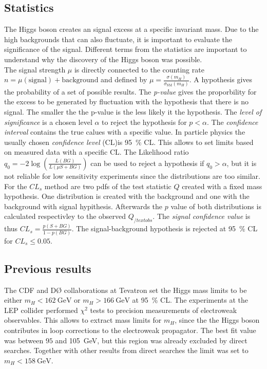 \subsection{Statistics}
The Higgs boson creates an signal excess at a specific invariant mass. Due to the high backgrounds that can also fluctuate, it is important to evaluate the significance of the signal. Different terms from the statistics are important to understand why the discovery of the Higgs boson was possible.\\
The signal strength $\mu$ is directly connected to the counting rate $n=\mu(\text{signal})+\text{background}$ and defined by $\mu = \frac{\sigma(m_H)}{\sigma_{\text{SM}}(m_H)}$. A hypothesis gives the probability of a set of possible results. The \textit{p-value} gives the proporbility for the excess to be generated by fluctuation with the hypothesis that there is no signal. The smaller the the p-value is the less likely it the hypothesis. The \textit{level of significance} is a chosen level $\alpha$ to reject the hypothesis for $p<\alpha$. The \textit{confidence interval} contains the true calues with a specific value. In particle physics the usually chosen \textit{confidence level} (CL)is \SI{95}{\percent} CL. This allows to set limits based on measured data with a specific CL.
The Likelihood ratio $q_0 = -2 \log \left(\frac{L(BG)}{L(\mu S+BG)}\right)$ can be used to reject a hypothesis if $q_0>\alpha$, but it is not reliable for low sensitivity experiments since the distributions are too similar.\\
For the $CL_s$ method are two pdfs of the test statistic $Q$ created with a fixed mass hypothesis. One distribution is created with the background and one with the background with signal hypithesis. Afterwards the $p$ value of both distributions is calculated respectivley to the observed $Q_{/text{obs}}$. The \textit{signal confidence value} is thus $CL_s = \frac{p(S+BG)}{1-p(BG)}$. The signal-background hypothesis is rejected at \SI{95}{\percent} CL for $CL_s\leq 0.05$.
\subsection{Previous results}
The CDF and D\O\; collaborations at Tevatron set the Higgs mass limits to be either $m_H<\SI{162}{\GeV}$ or $m_H>\SI{166}{\GeV}$ at \SI{95}{\percent} CL. The experiments at the LEP collider performed $\chi^2$ tests to precision measurements of electroweak observables. This allows to extract mass limits for $m_H$, since the the Higgs boson contributes in loop corrections to the electroweak propagator. The best fit value was between $95$ and \SI{105}{\GeV}, but this region was already excluded by direct searches. Together with other results from direct searches the limit was set to $m_H < \SI{158}{\GeV}$.
